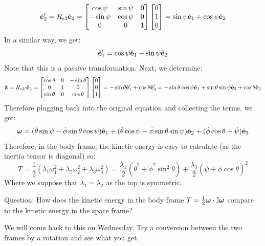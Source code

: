 \[\hat{\mathbf{e}}_2' = R_{e3}\hat{\mathbf{e}}_2 = \begin{bmatrix}\cos\psi & \sin\psi & 0 \\ -\sin\psi & \cos\psi & 0 \\ 0 & 0 & 1\end{bmatrix}\begin{bmatrix}0 \\ 1 \\ 0\end{bmatrix} = \sin\psi\hat{\mathbf{e}}_1 + \cos\psi\hat{\mathbf{e}}_2 \]
In a similar way, we get:
\[\hat{\mathbf{e}}_1' = \cos\psi\hat{\mathbf{e}}_1 - \sin\psi\hat{\mathbf{e}}_2\]
Note that this is a passive transformation. Next, we determine:
\[\hat{\mathbf{z}} = R_{e2'}\hat{\mathbf{e}}_3 = \begin{bmatrix}\cos\theta & 0 & -\sin\theta \\ 0 & 1 & 0 \\ \sin\theta & 0 & \cos\theta\end{bmatrix}\begin{bmatrix}0 \\ 0 \\1\end{bmatrix} = -\sin\theta\hat{\mathbf{e}}_1' + \cos\theta\hat{\mathbf{e}}_3' = -\sin\theta\cos\psi\hat{\mathbf{e}}_1 + \sin\theta\sin\psi\hat{\mathbf{e}}_2 + \cos\theta\hat{\mathbf{e}}_3\]
Therefore plugging back into the original equation and collecting the terms, we get:
\[\bm{\omega} = (\dot{\theta}\sin\psi - \dot{\phi}\sin\theta\cos\psi)\hat{\mathbf{e}}_1 + (\dot{\theta}\cos\psi+\dot{\phi}\sin\theta\sin\psi)\hat{\mathbf{e}}_2 + (\dot{\phi}\cos\theta + \dot{\psi})\hat{\mathbf{e}}_3\]
Therefore, in the body frame, the kinetic energy is easy to calculate (as the inertia tensor is diagonal) so:
\[T = \frac{1}{2}\left(\lambda_1\omega_1^2 + \lambda_2\omega_2^2 + \lambda_3\omega_3^2\right) = \frac{\lambda_1}{2}(\dot{\theta}^2 + \dot{\phi}^2\sin^2\theta) + \frac{\lambda_3}{2}(\dot{\psi} + \dot{\phi}\cos\theta)^2 \]
Where we suppose that $\lambda_1 = \lambda_2$ as the top is symmetric.

\noindent Question: How does the kinetic energy in the body frame $T = \frac{1}{2}\bm{\omega} \cdot \mathbb{I} \bm{\omega}$ compare to the kinetic energy in the space frame?
\begin{s}
We will come back to this on Wednesday. Try a conversion between the two frames by a rotation and see what you get.
\end{s}

